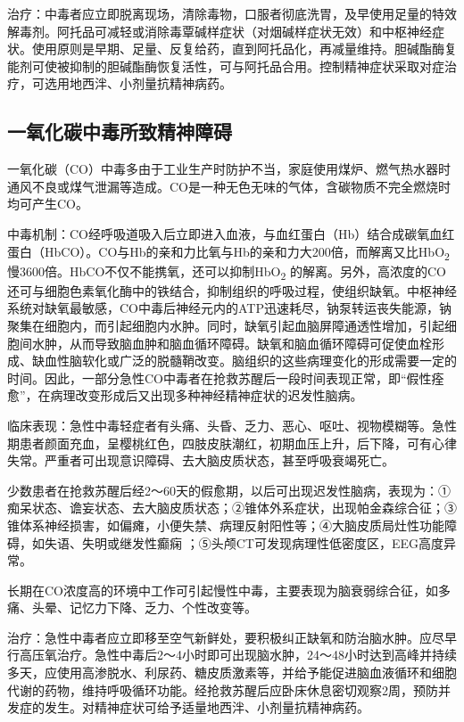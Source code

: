 治疗：中毒者应立即脱离现场，清除毒物，口服者彻底洗胃，及早使用足量的特效解毒剂。阿托品可减轻或消除毒覃碱样症状（对烟碱样症状无效）和中枢神经症状。使用原则是早期、足量、反复给药，直到阿托品化，再减量维持。胆碱酯酶复能剂可使被抑制的胆碱酯酶恢复活性，可与阿托品合用。控制精神症状采取对症治疗，可选用地西泮、小剂量抗精神病药。

\subsection{一氧化碳中毒所致精神障碍}

一氧化碳（CO）中毒多由于工业生产时防护不当，家庭使用煤炉、燃气热水器时通风不良或煤气泄漏等造成。CO是一种无色无味的气体，含碳物质不完全燃烧时均可产生CO。

中毒机制：CO经呼吸道吸入后立即进入血液，与血红蛋白（Hb）结合成碳氧血红蛋白（HbCO）。CO与Hb的亲和力比氧与Hb的亲和力大200倍，而解离又比HbO\textsubscript{2}
慢3600倍。HbCO不仅不能携氧，还可以抑制HbO\textsubscript{2}
的解离。另外，高浓度的CO还可与细胞色素氧化酶中的铁结合，抑制组织的呼吸过程，使组织缺氧。中枢神经系统对缺氧最敏感，CO中毒后神经元内的ATP迅速耗尽，钠泵转运丧失能源，钠聚集在细胞内，而引起细胞内水肿。同时，缺氧引起血脑屏障通透性增加，引起细胞间水肿，从而导致脑血肿和脑血循环障碍。缺氧和脑血循环障碍可促使血栓形成、缺血性脑软化或广泛的脱髓鞘改变。脑组织的这些病理变化的形成需要一定的时间。因此，一部分急性CO中毒者在抢救苏醒后一段时间表现正常，即``假性痊愈''，在病理改变形成后又出现多种神经精神症状的迟发性脑病。

临床表现：急性中毒轻症者有头痛、头昏、乏力、恶心、呕吐、视物模糊等。急性期患者颜面充血，呈樱桃红色，四肢皮肤潮红，初期血压上升，后下降，可有心律失常。严重者可出现意识障碍、去大脑皮质状态，甚至呼吸衰竭死亡。

少数患者在抢救苏醒后经2～60天的假愈期，以后可出现迟发性脑病，表现为：①痴呆状态、谵妄状态、去大脑皮质状态；②锥体外系症状，出现帕金森综合征；③锥体系神经损害，如偏瘫，小便失禁、病理反射阳性等；④大脑皮质局灶性功能障碍，如失语、失明或继发性癫痫
；⑤头颅CT可发现病理性低密度区，EEG高度异常。

长期在CO浓度高的环境中工作可引起慢性中毒，主要表现为脑衰弱综合征，如多痛、头晕、记忆力下降、乏力、个性改变等。

治疗：急性中毒者应立即移至空气新鲜处，要积极纠正缺氧和防治脑水肿。应尽早行高压氧治疗。急性中毒后2～4小时即可出现脑水肿，24～48小时达到高峰并持续多天，应使用高渗脱水、利尿药、糖皮质激素等，并给予能促进脑血液循环和细胞代谢的药物，维持呼吸循环功能。经抢救苏醒后应卧床休息密切观察2周，预防并发症的发生。对精神症状可给予适量地西泮、小剂量抗精神病药。

